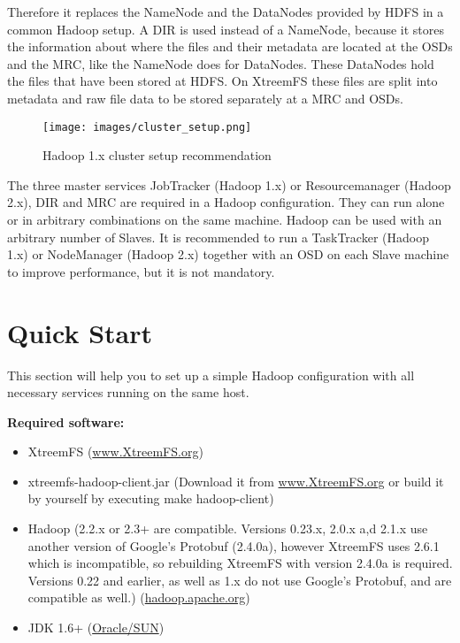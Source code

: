 \documentclass[a4paper,10pt]{book}
\begin{document}
Therefore it replaces the NameNode and the DataNodes provided by HDFS in a common Hadoop setup. A DIR is used instead of a NameNode, because it stores the information about where the files and their metadata are located at the OSDs and the MRC, like the NameNode does for DataNodes. These DataNodes hold the files that have been stored at HDFS. On XtreemFS these files are split into metadata and raw file data to be stored separately at a MRC and OSDs.

\begin{figure}[h]
 \centering
 \texttt{[image: images/cluster\_setup.png]}
 \caption{Hadoop 1.x cluster setup recommendation}
 \label{fig:cluster_setup}
\end{figure}

The three master services JobTracker (Hadoop 1.x) or Resourcemanager (Hadoop 2.x), DIR and MRC are required in a Hadoop configuration. They can run alone or in arbitrary combinations on the same machine. Hadoop can be used with an arbitrary number of Slaves. It is recommended to run a TaskTracker (Hadoop 1.x) or NodeManager (Hadoop 2.x) together with an OSD on each Slave machine to improve performance, but it is not mandatory.

\section{Quick Start}
\label{sec:hadoop_quickstart}

This section will help you to set up a simple Hadoop configuration with all necessary services running on the same host.

\textbf{Required software:}
\begin{itemize}
\item XtreemFS (\href{http://xtreemfs.org/download.php?t=source}{www.XtreemFS.org})
\item xtreemfs-hadoop-client.jar (Download it from \href{http://www.xtreemfs.org/downloads/xtreemfs-hadoop-client.jar}{www.XtreemFS.org} or build it by yourself by executing make hadoop-client)
\item Hadoop (2.2.x or 2.3+ are compatible. Versions 0.23.x, 2.0.x a,d 2.1.x use another version of Google's Protobuf (2.4.0a), however XtreemFS uses 2.6.1 which is incompatible, so rebuilding XtreemFS with version 2.4.0a is required. Versions 0.22 and earlier, as well as 1.x do not use Google's Protobuf, and are compatible as well.) (\href{http://hadoop.apache.org}{hadoop.apache.org})
\item JDK 1.6+ (\href{http://java.sun.com}{Oracle/SUN})
\end{itemize}
\end{document}
